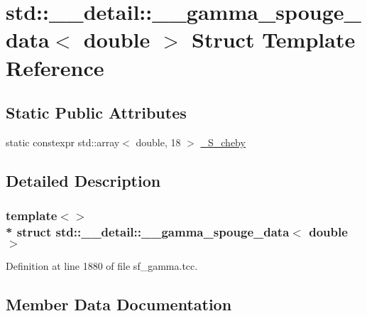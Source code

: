 \hypertarget{structstd_1_1____detail_1_1____gamma__spouge__data_3_01double_01_4}{}\section{std\+:\+:\+\_\+\+\_\+detail\+:\+:\+\_\+\+\_\+gamma\+\_\+spouge\+\_\+data$<$ double $>$ Struct Template Reference}
\label{structstd_1_1____detail_1_1____gamma__spouge__data_3_01double_01_4}
\subsection*{Static Public Attributes}
\begin{DoxyCompactItemize}
\item 
static constexpr std\+::array$<$ double, 18 $>$ \hyperlink{structstd_1_1____detail_1_1____gamma__spouge__data_3_01double_01_4_ae7638accff257079573b702a72e01254}{\+\_\+\+S\+\_\+cheby}
\end{DoxyCompactItemize}


\subsection{Detailed Description}
\subsubsection*{template$<$$>$\\*
struct std\+::\+\_\+\+\_\+detail\+::\+\_\+\+\_\+gamma\+\_\+spouge\+\_\+data$<$ double $>$}



Definition at line 1880 of file sf\+\_\+gamma.\+tcc.



\subsection{Member Data Documentation}
